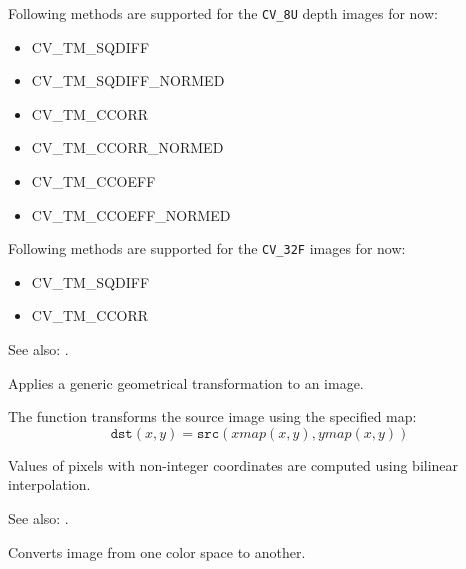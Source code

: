 Following methods are supported for the \texttt{CV\_8U} depth images for now:
\begin{itemize}
\item CV\_TM\_SQDIFF \item CV\_TM\_SQDIFF\_NORMED \item CV\_TM\_CCORR \item CV\_TM\_CCORR\_NORMED \item CV\_TM\_CCOEFF \item CV\_TM\_CCOEFF\_NORMED 
\end{itemize}
Following methods are supported for the \texttt{CV\_32F} images for now:
\begin{itemize}
\item CV\_TM\_SQDIFF \item CV\_TM\_CCORR
\end{itemize}

See also: . 


Applies a generic geometrical transformation to an image.


\begin{description}
\end{description}

The function transforms the source image using the specified map:
\[
\texttt{dst}(x,y) = \texttt{src}(xmap(x,y), ymap(x,y))
\]

Values of pixels with non-integer coordinates are computed using bilinear interpolation.

See also: .


Converts image from one color space to another.


